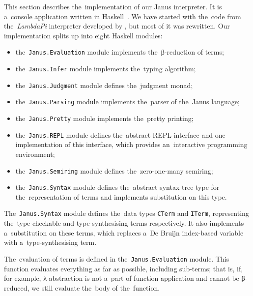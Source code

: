 \begin{center}
\end{center}

\label{sec:architecture}

This section describes the~implementation of our Janus interpreter. It is
a~console application written in Haskell~\citep{haskell_2010}. We have started
with the~code from the~\emph{LambdaPi} interpreter developed by
\citet{loh_et_al_2010}, but most of it was rewritten. Our implementation splits
up into eight Haskell modules:
\begin{itemize}
  \item the~\texttt{Janus.Evaluation} module implements the~β-reduction of
    terms;
  \item the~\texttt{Janus.Infer} module implements the~typing algorithm;
  \item the~\texttt{Janus.Judgment} module defines the~judgment monad;
  \item the~\texttt{Janus.Parsing} module implements the~parser of the~Janus
    language;
  \item the~\texttt{Janus.Pretty} module implements the~pretty printing;
  \item the~\texttt{Janus.REPL} module defines the~abstract REPL interface and
    one implementation of this interface, which provides an~interactive
    programming environment;
  \item the~\texttt{Janus.Semiring} module defines the~zero-one-many semiring;
  \item the~\texttt{Janus.Syntax} module defines the~abstract syntax tree type
    for the~representation of terms and implements substitution on this type.
\end{itemize}

The~\texttt{Janus.Syntax} module defines the~data types \texttt{CTerm} and
\texttt{ITerm}, representing the~type-checkable and type-synthesising terms
respectively. It also implements a~substitution on these terms, which replaces
a~De Bruijn index-based variable with a~type-synthesising term.

The~evaluation of terms is defined in the~\texttt{Janus.Evaluation} module. This
function evaluates everything as far as possible, including sub-terms; that is,
if, for example, λ-abstraction is not a~part of function application and cannot
be β-reduced, we still evaluate the~body of the~function.

